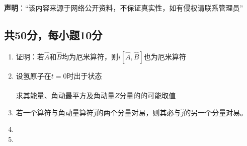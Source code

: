 
\textbf{声明}：“该内容来源于网络公开资料，不保证真实性，如有侵权请联系管理员”

\subsection{共50分，每小题10分}
\begin{enumerate}
\item 证明：若$\hat{A}$和$\hat{B}$均为厄米算符，则$i[\hat{A},\hat{B}]$也为厄米算符
\item 设氢原子在$t=0$时出于状态\\\\
求其能量、角动最平方及角动量$Z$分量的的可能取值
\item 若一个算符与角动量算符$\hat{j}$的两个分量对易，则其必与$\hat{j}$的另一个分量对易。
\item 
\item 
\end{enumerate}
